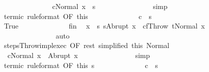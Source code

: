 \begin{isabellebody}
\ \ \ \ \ \ \ \ \ \ \ \ \isamarkupfalse%
\ {\isachardoublequoteopen}{\isasymGamma}{\isasymturnstile}\ {\isasymlangle}c{\isacharprime}{\isacharprime}{\isacharcomma}Normal\ x{\isasymrangle}\ {\isasymRightarrow}\ s{\isacharprime}{\isachardoublequoteclose}\isanewline
\ \ \ \ \ \ \ \ \ \ \ \ \ \ \isamarkupfalse%
\ simp\isanewline
\ \ \ \ \ \ \ \ \ \ \ \ \isamarkupfalse%
\ termi{\isacharunderscore}c\ {\isacharbrackleft}rule{\isacharunderscore}format{\isacharcomma}\ OF\ this{\isacharbrackright}\isanewline
\ \ \ \ \ \ \ \ \ \ \ \ \isamarkupfalse%
\ {\isachardoublequoteopen}{\isasymGamma}{\isasymturnstile}c\ {\isasymdown}\ s{\isacharprime}{\isachardoublequoteclose}\ \isacommand{{\isachardot}}\isamarkupfalse%
\isanewline
\ \ \ \ \ \ \ \ \ \ \isamarkupfalse%
\isanewline
\ \ \ \ \ \ \ \ \ \ \ \ \isamarkupfalse%
\ True\isanewline
\ \ \ \ \ \ \ \ \ \ \ \ \isamarkupfalse%
\ fin\ \isamarkupfalse%
\ x{\isacharprime}\ \ s{\isacharprime}{\isacharcolon}\ {\isachardoublequoteopen}s{\isacharprime}{\isacharequal}Abrupt\ x{\isacharprime}{\isachardoublequoteclose}\ \ {\isachardoublequoteopen}c\isactrlsub f{\isacharequal}Throw{\isachardoublequoteclose}\ {\isachardoublequoteopen}t{\isacharequal}Normal\ x{\isacharprime}{\isachardoublequoteclose}\isanewline
\ \ \ \ \ \ \ \ \ \ \ \ \ \ \isamarkupfalse%
\ auto\isanewline
\ \ \ \ \ \ \ \ \ \ \ \ \isamarkupfalse%
\ steps{\isacharunderscore}Throw{\isacharunderscore}impl{\isacharunderscore}exec\ {\isacharbrackleft}OF\ rest\ {\isacharbrackleft}simplified\ this{\isacharbrackright}{\isacharbrackright}\ Normal\ \isanewline
\ \ \ \ \ \ \ \ \ \ \ \ \isamarkupfalse%
\ {\isachardoublequoteopen}{\isasymGamma}{\isasymturnstile}\ {\isasymlangle}c{\isacharprime}{\isacharprime}{\isacharcomma}Normal\ x{\isasymrangle}\ {\isasymRightarrow}\ Abrupt\ x{\isacharprime}{\isachardoublequoteclose}\isanewline
\ \ \ \ \ \ \ \ \ \ \ \ \ \ \isamarkupfalse%
\ simp\isanewline
\ \ \ \ \ \ \ \ \ \ \ \ \isamarkupfalse%
\ termi{\isacharunderscore}c\ {\isacharbrackleft}rule{\isacharunderscore}format{\isacharcomma}\ OF\ this{\isacharbrackright}\ s{\isacharprime}\isanewline
\ \ \ \ \ \ \ \ \ \ \ \ \isamarkupfalse%
\ {\isachardoublequoteopen}{\isasymGamma}{\isasymturnstile}c\ {\isasymdown}\ s{\isacharprime}{\isachardoublequoteclose}\ \isamarkupfalse%

\end{isabellebody}

